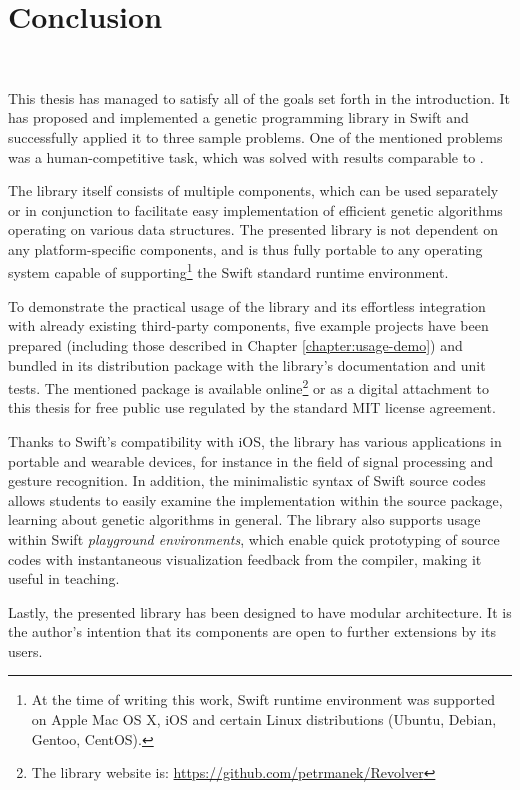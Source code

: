 \chapter{Conclusion}~\label{chapter:conclusion}

This thesis has managed to satisfy all of the goals set forth in the introduction. It has proposed and implemented a genetic programming library in Swift and successfully applied it to three sample problems. One of the mentioned problems was a human-competitive task, which was solved with results comparable to \cite{EvolvingQwopGaits}.

The library itself consists of multiple components, which can be used separately or in conjunction to facilitate easy implementation of efficient genetic algorithms operating on various data structures. The presented library is not dependent on any platform-specific components, and is thus fully portable to any operating system capable of supporting\footnote{At the time of writing this work, Swift runtime environment was supported on Apple Mac OS X, iOS and certain Linux distributions (Ubuntu, Debian, Gentoo, CentOS).} the Swift standard runtime environment. 

To demonstrate the practical usage of the library and its effortless integration with already existing third-party components, five example projects have been prepared (including those described in Chapter \ref{chapter:usage-demo}) and bundled in its distribution package with the library's documentation and unit tests. The mentioned package is available online\footnote{The library website is: \url{https://github.com/petrmanek/Revolver}} or as a digital attachment to this thesis for free public use regulated by the standard MIT license agreement.

Thanks to Swift's compatibility with iOS, the library has various applications in portable and wearable devices, for instance in the field of signal processing and gesture recognition. In addition, the minimalistic syntax of Swift source codes allows students to easily examine the implementation within the source package, learning about genetic algorithms in general. The library also supports usage within Swift \textit{playground environments}, which enable quick prototyping of source codes with instantaneous visualization feedback from the compiler, making it useful in teaching.

Lastly, the presented library has been designed to have modular architecture. It is the author's intention that its components are open to further extensions by its users.

